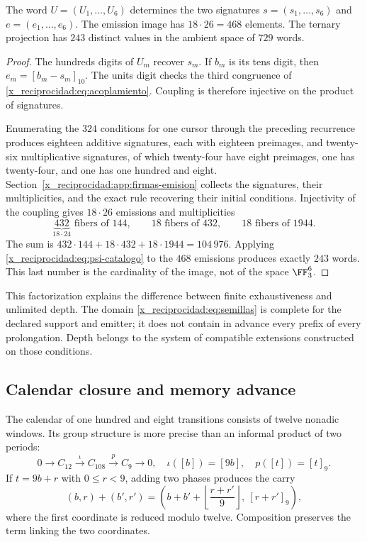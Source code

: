 \begin{proposition}
The word \(U=(U_1,\ldots,U_6)\) determines the two signatures \(s=(s_1,\ldots,s_6)\) and \(e=(e_1,\ldots,e_6)\). The emission image has \(18\cdot26=468\) elements. The ternary projection has \(243\) distinct values in the ambient space of \(729\) words.
\end{proposition}
\begin{proof}
The hundreds digits of \(U_m\) recover \(s_m\). If \(b_m\) is its tens digit, then \(e_m=[b_m-s_m]_{10}\). The units digit checks the third congruence of \eqref{x_reciprocidad:eq:acoplamiento}. Coupling is therefore injective on the product of signatures.

Enumerating the \(324\) conditions for one cursor through the preceding recurrence produces eighteen additive signatures, each with eighteen preimages, and twenty-six multiplicative signatures, of which twenty-four have eight preimages, one has twenty-four, and one has one hundred and eight. Section~\ref{x_reciprocidad:app:firmas-emision} collects the signatures, their multiplicities, and the exact rule recovering their initial conditions. Injectivity of the coupling gives \(18\cdot26\) emissions and multiplicities
\[
 \underbrace{432}_{18\cdot24}\text{ fibers of }144,
 \qquad18\text{ fibers of }432,
 \qquad18\text{ fibers of }1944.
\]
The sum is \(432\cdot144+18\cdot432+18\cdot1944=104\,976\). Applying \eqref{x_reciprocidad:eq:psi-catalogo} to the \(468\) emissions produces exactly \(243\) words. This last number is the cardinality of the image, not of the space \(\FF_3^6\).
\end{proof}

This factorization explains the difference between finite exhaustiveness and unlimited depth. The domain \eqref{x_reciprocidad:eq:semillas} is complete for the declared support and emitter; it does not contain in advance every prefix of every prolongation. Depth belongs to the system of compatible extensions constructed on those conditions.

\subsection{Calendar closure and memory advance}

The calendar of one hundred and eight transitions consists of twelve nonadic windows. Its group structure is more precise than an informal product of two periods:
\begin{equation}
 0\longrightarrow C_{12}\xrightarrow{\iota}C_{108}
 \xrightarrow{p}C_9\longrightarrow0,
 \quad\iota([b])=[9b],\quad p([t])=[t]_9.
 \label{x_reciprocidad:eq:extension108}
\end{equation}
If \(t=9b+r\) with \(0\le r<9\), adding two phases produces the carry
\[
 (b,r)+(b',r')=
 \left(b+b'+\left\lfloor\frac{r+r'}9\right\rfloor,\ [r+r']_9\right),
\]
where the first coordinate is reduced modulo twelve. Composition preserves the term linking the two coordinates.

